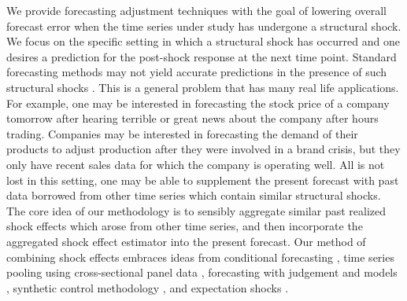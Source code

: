 \documentclass[11pt,3p,review,authoryear]{elsarticle}
\theoremstyle{definition}
\begin{document}
We provide forecasting adjustment techniques with the goal of lowering overall forecast error when the time series under study has undergone a structural shock. We focus on the specific setting in which a structural shock has occurred and one desires a prediction for the post-shock response at the next time point. Standard forecasting methods may not yield accurate predictions in the presence of such structural shocks \citep{baumeister2014real}. This is a general problem that has many real life applications. For example, one may be interested in forecasting the stock price of a company tomorrow after hearing terrible or great news about the company  after hours trading. Companies may be interested in forecasting the demand of their products to adjust production after they were involved in a brand crisis, but they only have recent sales data for which the company is operating well. All is not lost in this setting, one may be able to supplement the present forecast with past data borrowed from other time series which contain similar structural shocks. The core idea of our methodology is to sensibly aggregate similar past realized shock effects which arose from other time series, and then incorporate the aggregated shock effect estimator into the present forecast. Our method of combining shock effects embraces ideas from conditional forecasting \citep{baumeister2014real, kilian2017structural}, time series pooling using cross-sectional panel data \citep{ramaswamy1993empirical, pesaran1999pooled, hoogstrate2000pooling, baltagi2008forecasting, koop2012forecasting, liu2020forecasting}, forecasting with judgement and models \citep{svensson2005monetary, monti2008forecast}, synthetic control methodology \citep{abadie2010synthetic, agarwal2020two}, and expectation shocks \citep{croushore2006data, baumeister2014general, clements2019measuring}. 
\end{document}
